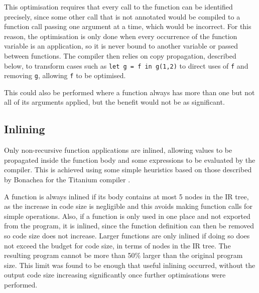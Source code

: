 
This optimisation requires that every call to the function can be identified precisely, since some other call that is not annotated would be compiled to a function call passing one argument at a time, which would be incorrect. For this reason, the optimisation is only done when every occurrence of the function variable is an application, so it is never bound to another variable or passed between functions. The compiler then relies on copy propagation, described below, to transform cases such as  \verb|let g = f in g(1,2)| to direct uses of \verb|f| and removing \verb|g|, allowing \verb|f| to be optimised. 

This could also be performed where a function always has more than one but not all of its arguments applied, but the benefit would not be as significant.


\subsection{Inlining}
Only non-recursive function applications are inlined, allowing values to be propagated inside the function body and some expressions to be evaluated by the compiler. This is achieved using some simple heuristics based on those described by Bonachea for the Titanium compiler \cite{titanium}. 

A function is always inlined if its body contains at most 5 nodes in the IR tree, as the increase in code size is negligible and this avoids making function calls for simple operations. Also, if a function is only used in one place and not exported from the program, it is inlined, since the function definition can then be removed so code size does not increase.
Larger functions are only inlined if doing so does not exceed the budget for code size, in terms of nodes in the IR tree. The resulting program cannot be more than 50\% larger than the original program size.
This limit was found to be enough that useful inlining occurred, without the output code size increasing significantly once further optimisations were performed.


